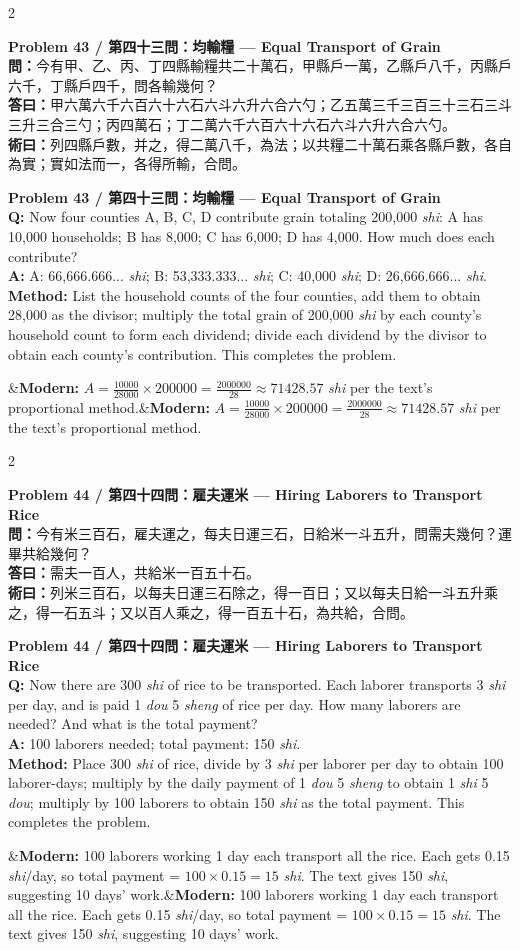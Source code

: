 \documentclass[11pt,a4paper]{article}
\newcommand{\bilingualproblem}[4]{%
  \begin{paracol}{2}
  \begin{leftcolumn}
  \noindent\textbf{\color{problemcolor}#1}\\[0.2cm]
  #2
  \end{leftcolumn}
  \switchcolumn
  \noindent\textbf{\color{problemcolor}#1}\\[0.2cm]
  #3
  \end{paracol}
  \ifx&#4&\else\vspace{0.3cm}\noindent#4\fi
  \vspace{0.5cm}
}
\newcommand{\wen}[1]{\textcolor{problemcolor}{\textbf{問：}}#1}
\newcommand{\da}[1]{\textcolor{answercolor}{\textbf{答曰：}}#1}
\newcommand{\shu}[1]{\textcolor{methodcolor}{\textbf{術曰：}}#1}
\newcommand{\wenen}[1]{\textcolor{problemcolor}{\textbf{Q:}} #1}
\newcommand{\daen}[1]{\textcolor{answercolor}{\textbf{A:}} #1}
\newcommand{\shuen}[1]{\textcolor{methodcolor}{\textbf{Method:}} #1}
\begin{document}
\newpage

\bilingualproblem{Problem 43 / 第四十三問：均輸糧 --- Equal Transport of Grain}{
\wen{今有甲、乙、丙、丁四縣輸糧共二十萬石，甲縣戶一萬，乙縣戶八千，丙縣戶六千，丁縣戶四千，問各輸幾何？}\\[0.2cm]
\da{甲六萬六千六百六十六石六斗六升六合六勺；乙五萬三千三百三十三石三斗三升三合三勺；丙四萬石；丁二萬六千六百六十六石六斗六升六合六勺。}\\[0.2cm]
\shu{列四縣戶數，并之，得二萬八千，為法；以共糧二十萬石乘各縣戶數，各自為實；實如法而一，各得所輸，合問。}
}{
\wenen{Now four counties A, B, C, D contribute grain totaling 200,000 \textit{shi}: A has 10,000 households; B has 8,000; C has 6,000; D has 4,000. How much does each contribute?}\\[0.2cm]
\daen{A: 66,666.666... \textit{shi}; B: 53,333.333... \textit{shi}; C: 40,000 \textit{shi}; D: 26,666.666... \textit{shi}.}\\[0.2cm]
\shuen{List the household counts of the four counties, add them to obtain 28,000 as the divisor; multiply the total grain of 200,000 \textit{shi} by each county's household count to form each dividend; divide each dividend by the divisor to obtain each county's contribution. This completes the problem.}
}{\textbf{Modern:} $A = \frac{10000}{28000} \times 200000 = \frac{2000000}{28} \approx 71428.57$ \textit{shi} per the text's proportional method.}

\bilingualproblem{Problem 44 / 第四十四問：雇夫運米 --- Hiring Laborers to Transport Rice}{
\wen{今有米三百石，雇夫運之，每夫日運三石，日給米一斗五升，問需夫幾何？運畢共給幾何？}\\[0.2cm]
\da{需夫一百人，共給米一百五十石。}\\[0.2cm]
\shu{列米三百石，以每夫日運三石除之，得一百日；又以每夫日給一斗五升乘之，得一石五斗；又以百人乘之，得一百五十石，為共給，合問。}
}{
\wenen{Now there are 300 \textit{shi} of rice to be transported. Each laborer transports 3 \textit{shi} per day, and is paid 1 \textit{dou} 5 \textit{sheng} of rice per day. How many laborers are needed? And what is the total payment?}\\[0.2cm]
\daen{100 laborers needed; total payment: 150 \textit{shi}.}\\[0.2cm]
\shuen{Place 300 \textit{shi} of rice, divide by 3 \textit{shi} per laborer per day to obtain 100 laborer-days; multiply by the daily payment of 1 \textit{dou} 5 \textit{sheng} to obtain 1 \textit{shi} 5 \textit{dou}; multiply by 100 laborers to obtain 150 \textit{shi} as the total payment. This completes the problem.}
}{\textbf{Modern:} 100 laborers working 1 day each transport all the rice. Each gets 0.15 \textit{shi}/day, so total payment = $100 \times 0.15 = 15$ \textit{shi}. The text gives 150 \textit{shi}, suggesting 10 days' work.}
\end{document}
